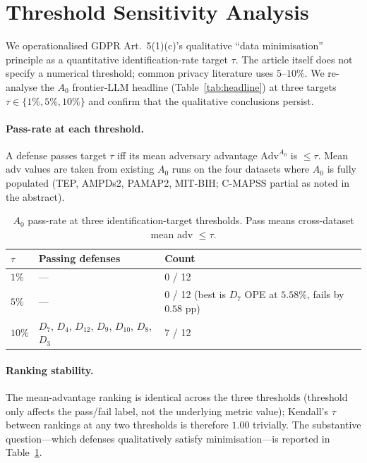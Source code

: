 \documentclass{article}
\theoremstyle{remark}
\begin{document}
\section{Threshold Sensitivity Analysis}
\label{app:threshold}

We operationalised GDPR Art.~5(1)(c)'s qualitative ``data minimisation'' principle as a quantitative identification-rate target $\tau$. The article itself does not specify a numerical threshold; common privacy literature uses $5$--$10\%$. We re-analyse the $A_0$ frontier-LLM headline (Table~\ref{tab:headline}) at three targets $\tau \in \{1\%, 5\%, 10\%\}$ and confirm that the qualitative conclusions persist.

\paragraph{Pass-rate at each threshold.} A defense passes target $\tau$ iff its mean adversary advantage $\mathrm{Adv}^{A_0}$ is $\le \tau$. Mean adv values are taken from existing $A_0$ runs on the four datasets where $A_0$ is fully populated (TEP, AMPDs2, PAMAP2, MIT-BIH; C-MAPSS partial as noted in the abstract).

\begin{table}[h]
\centering
\caption{$A_0$ pass-rate at three identification-target thresholds. Pass means cross-dataset mean adv $\le \tau$.}
\label{tab:threshold_passrate}
\small
\begin{tabular}{@{}lll@{}}
\toprule
$\tau$ & Passing defenses & Count \\
\midrule
$1\%$ & --- & $0$ / 12 \\
$5\%$ & --- & $0$ / 12 (best is $D_7$ OPE at $5.58\%$, fails by $0.58$ pp) \\
$10\%$ & $D_7$, $D_4$, $D_{12}$, $D_9$, $D_{10}$, $D_8$, $D_3$ & $7$ / 12 \\
\bottomrule
\end{tabular}
\end{table}

\paragraph{Ranking stability.} The mean-advantage ranking is identical across the three thresholds (threshold only affects the pass/fail label, not the underlying metric value); Kendall's $\tau$ between rankings at any two thresholds is therefore $1.00$ trivially. The substantive question---which defenses qualitatively satisfy minimisation---is reported in Table~\ref{tab:threshold_passrate}.
\end{document}
